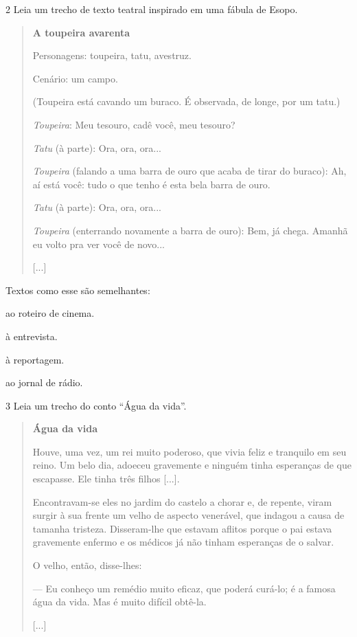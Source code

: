 \num{2} Leia um trecho de texto teatral inspirado em uma fábula de Esopo.

\begin{quote}
\textbf{A toupeira avarenta}

Personagens: toupeira, tatu, avestruz.

Cenário: um campo.

(Toupeira está cavando um buraco. É observada, de longe, por um tatu.)

\emph{Toupeira}: Meu tesouro, cadê você, meu tesouro?

\emph{Tatu} (à parte): Ora, ora, ora...

\emph{Toupeira} (falando a uma barra de ouro que acaba de tirar do
buraco): Ah, aí está você: tudo o que tenho é esta bela barra de ouro.

\emph{Tatu} (à parte): Ora, ora, ora...

\emph{Toupeira} (enterrando novamente a barra de ouro): Bem, já chega.
Amanhã eu volto pra ver você de novo...

{[}...{]}

\end{quote}

Textos como esse são semelhantes:

\begin{escolha}
\item ao roteiro de cinema.

\item à entrevista.

\item à reportagem.

\item ao jornal de rádio.
\end{escolha}


\num{3} Leia um trecho do conto ``Água da vida''.

\begin{quote}
\textbf{Água da vida}

Houve, uma vez, um rei muito poderoso, que vivia feliz e tranquilo em
seu reino. Um belo dia, adoeceu gravemente e ninguém tinha esperanças de
que escapasse. Ele tinha três filhos {[}...{]}.

Encontravam-se eles no jardim do castelo a chorar e, de repente, viram
surgir à sua frente um velho de aspecto venerável, que indagou a causa
de tamanha tristeza. Disseram-lhe que estavam aflitos porque o pai
estava gravemente enfermo e os médicos já não tinham esperanças de o
salvar.

O velho, então, disse-lhes:

--- Eu conheço um remédio muito eficaz, que poderá curá-lo; é a famosa
água da vida. Mas é muito difícil obtê-la.

{[}...{]}

\end{quote}

